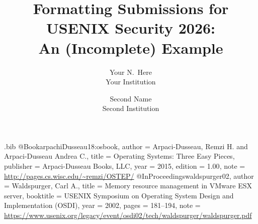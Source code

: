\renewcommand{\arraystretch}{1.05}
\setlength{\tabcolsep}{6pt}


\usepackage{filecontents}

\begin{filecontents}{\jobname.bib}
@Book{arpachiDusseau18:osbook,
  author =       {Arpaci-Dusseau, Remzi H. and Arpaci-Dusseau Andrea C.},
  title =        {Operating Systems: Three Easy Pieces},
  publisher =    {Arpaci-Dusseau Books, LLC},
  year =         2015,
  edition =      {1.00},
  note =         {\url{http://pages.cs.wisc.edu/~remzi/OSTEP/}}
}
@InProceedings{waldspurger02,
  author =       {Waldspurger, Carl A.},
  title =        {Memory resource management in {VMware ESX} server},
  booktitle =    {USENIX Symposium on Operating System Design and
                  Implementation (OSDI)},
  year =         2002,
  pages =        {181--194},
  note =         {\url{https://www.usenix.org/legacy/event/osdi02/tech/waldspurger/waldspurger.pdf}}}
\end{filecontents}



\date{}

\title{\Large \bf Formatting Submissions for USENIX Security 2026:\\
  An (Incomplete) Example}

\author{
{\rm Your N.\ Here}\\
Your Institution
\and
{\rm Second Name}\\
Second Institution
} %

\maketitle

\begin{abstract}
\end{abstract}


